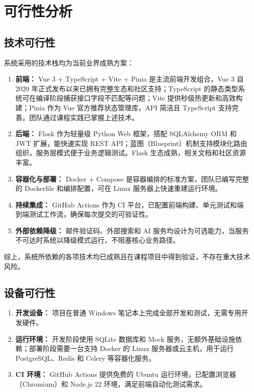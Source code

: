\documentclass[12pt,a4paper]{ctexart}
\begin{document}
    \section{可行性分析}
  \subsection{技术可行性}

  系统采用的技术栈均为当前业界成熟方案：
  \begin{enumerate}
  \item \textbf{前端：} Vue 3 + TypeScript + Vite + Pinia 是主流前端开发组合，Vue 3 自 2020 年正式发布以来已拥有完整生态和社区支持；TypeScript 的静态类型系统可在编译阶段捕获接口字段不匹配等问题；Vite 提供秒级热更新和高效构建；Pinia 作为 Vue 官方推荐状态管理库，API 简洁且 TypeScript 支持完善。团队通过课程实践已掌握上述技术。
  \item \textbf{后端：} Flask 作为轻量级 Python Web 框架，搭配 SQLAlchemy ORM 和 JWT 扩展，能快速实现 REST API；蓝图（Blueprint）机制支持模块化路由组织，服务层模式便于业务逻辑测试。Flask 生态成熟，相关文档和社区资源丰富。
  \item \textbf{容器化与部署：} Docker + Compose 是容器编排的标准方案，团队已编写完整的 Dockerfile 和编排配置，可在 Linux 服务器上快速重建运行环境。
  \item \textbf{持续集成：} GitHub Actions 作为 CI 平台，已配置前端构建、单元测试和端到端测试工作流，确保每次提交的可验证性。
  \item \textbf{外部依赖降级：} 邮件验证码、外部搜索和 AI 服务均设计为可选能力，当服务不可达时系统以降级模式运行，不阻塞核心业务路径。
  \end{enumerate}

  综上，系统所依赖的各项技术均已成熟且在课程项目中得到验证，不存在重大技术风险。

  \subsection{设备可行性}

  \begin{enumerate}
  \item \textbf{开发设备：} 项目在普通 Windows 笔记本上完成全部开发和测试，无需专用开发硬件。
  \item \textbf{运行环境：} 开发阶段使用 SQLite 数据库和 Mock 服务，无额外基础设施依赖；部署阶段需要一台支持 Docker 的 Linux 服务器或云主机，用于运行 PostgreSQL、Redis 和 Celery 等容器化服务。
  \item \textbf{CI 环境：} GitHub Actions 提供免费的 Ubuntu 运行环境，已配置浏览器（Chromium）和 Node.js 22 环境，满足前端自动化测试需求。
  \end{enumerate}
\end{document}
